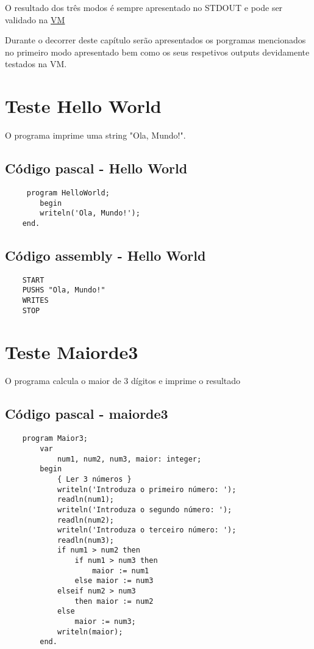 \documentclass[12pt,a4paper]{report}%
\begin{document}
O resultado dos três modos é sempre apresentado no STDOUT e pode ser validado na \href{https://ewvm.epl.di.uminho.pt}{VM} 

Durante o decorrer deste capítulo serão apresentados os porgramas mencionados no primeiro modo apresentado bem como os seus respetivos outputs devidamente testados na VM.


\section{Teste Hello World}
O programa imprime uma string "Ola, Mundo!".
\subsection{Código pascal - Hello World}

\begin{verbatim}
     program HelloWorld;
        begin
        writeln('Ola, Mundo!');
    end.
\end{verbatim}
\subsection{Código assembly - Hello World}
\begin{verbatim}
    START
    PUSHS "Ola, Mundo!"
    WRITES
    STOP
\end{verbatim}

\section{Teste Maiorde3}
O programa calcula o maior de 3 dígitos e imprime o resultado

\subsection{Código pascal - maiorde3}


\begin{verbatim}
    program Maior3;
        var  
            num1, num2, num3, maior: integer;
        begin
            { Ler 3 números }
            writeln('Introduza o primeiro número: ');  
            readln(num1);
            writeln('Introduza o segundo número: ');  
            readln(num2);
            writeln('Introduza o terceiro número: ');  
            readln(num3);
            if num1 > num2 then
                if num1 > num3 then 
                    maior := num1
                else maior := num3
            elseif num2 > num3 
                then maior := num2
            else 
                maior := num3;
            writeln(maior);
        end.
\end{verbatim}
\end{document}
